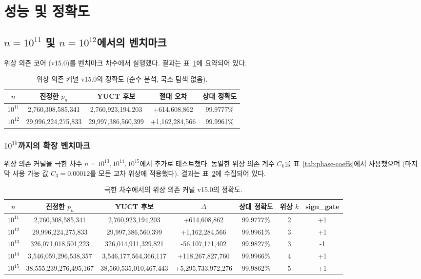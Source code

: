 \documentclass[11pt,a4paper]{article}
\begin{document}
	\section{성능 및 정확도}
	\label{sec:performance}
	\subsection{\(n=10^{11}\) 및 \(n=10^{12}\)에서의 벤치마크}
	위상 의존 코어 (v15.0)를 벤치마크 차수에서 실행했다. 결과는 표~\ref{tab:benchmark-v15}에 요약되어 있다.
	
	\begin{table}[htbp]
		\centering
		\caption{위상 의존 커널 v15.0의 정확도 (순수 분석, 국소 탐색 없음).}
		\label{tab:benchmark-v15}
		\begin{tabular}{c c c c c}
			\toprule
			\(n\) & 진정한 \(p_n\) & YUCT 후보 & 절대 오차 & 상대 정확도 \\
			\midrule
			\(10^{11}\) & 2,760,308,585,341 & 2,760,923,194,203 & +614,608,862 & 99.9777\% \\
			\(10^{12}\) & 29,996,224,275,833 & 29,997,386,560,399 & +1,162,284,566 & 99.9961\% \\
			\bottomrule
		\end{tabular}
	\end{table}
	
	\subsubsection{\(10^{15}\)까지의 확장 벤치마크}
	
	위상 의존 커널을 극한 차수
	\(n = 10^{13}, 10^{14}, 10^{15}\)에서 추가로 테스트했다. 동일한 위상 의존 계수
	\(C_k\)를 표~\ref{tab:phase-coeffs}에서 사용했으며 (마지막 사용 가능 값
	\(C_3 = 0.00012\)를 모든 고차 위상에 적용했다).
	결과는 표~\ref{tab:benchmark-extreme}에 수집되어 있다.
	
	\begin{table}[htbp]
		\centering
		\caption{극한 차수에서의 위상 의존 커널 v15.0의 정확도.}
		\label{tab:benchmark-extreme}
		\begin{tabular}{c c c c c c c}
			\toprule
			\(n\) & 진정한 \(p_n\) & YUCT 후보 & \(\Delta\) & 상대 정확도 & 위상 \(k\) & sign\_gate \\
			\midrule
			\(10^{11}\) & 2,760,308,585,341 & 2,760,923,194,203 & +614,608,862   & 99.9777\% & 2 & +1 \\
			\(10^{12}\) & 29,996,224,275,833 & 29,997,386,560,399 & +1,162,284,566 & 99.9961\% & 3 & +1 \\
			\(10^{13}\) & 326,071,018,501,223 & 326,014,911,329,821 & -56,107,171,402 & 99.9827\% & 3 & -1 \\
			\(10^{14}\) & 3,546,059,296,538,357 & 3,546,177,564,366,117 & +118,267,827,760 & 99.9966\% & 4 & +1 \\
			\(10^{15}\) & 38,555,239,276,495,167 & 38,560,535,010,467,443 & +5,295,733,972,276 & 99.9862\% & 5 & +1 \\
			\bottomrule
		\end{tabular}
	\end{table}
	
\end{document}
